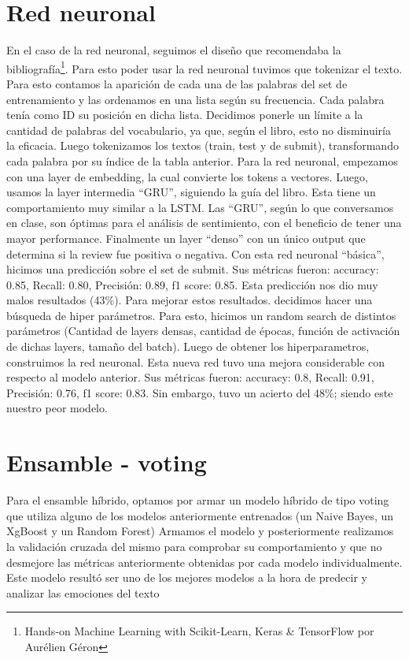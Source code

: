 \documentclass{article}
\begin{document}
\section*{Red neuronal}
En el caso de la red neuronal, seguimos el diseño que recomendaba la bibliografía\footnote{Hands-on Machine Learning with Scikit-Learn, Keras \& TensorFlow por Aurélien Géron}.
Para esto poder usar la red neuronal tuvimos que tokenizar el texto. Para esto contamos la aparición de cada una de las palabras del set de entrenamiento y las ordenamos en una lista según su frecuencia. Cada palabra tenía como ID su posición en dicha lista. Decidimos ponerle un límite a la cantidad de palabras del vocabulario, ya que, según el libro, esto no disminuiría la eficacia.  Luego tokenizamos los textos (train, test y de submit), transformando cada palabra por su índice de la tabla anterior. 
Para la red neuronal, empezamos con una layer de embedding, la cual convierte los tokens a vectores. Luego, usamos la layer intermedia “GRU”, siguiendo la guía del libro. Esta tiene un comportamiento muy similar a la LSTM. Las “GRU”, según lo que conversamos en clase,  son óptimas para el análisis de sentimiento, con el beneficio de tener una mayor performance. Finalmente un layer “denso” con un único output que determina si la review fue positiva o negativa. 
Con esta red neuronal “básica”, hicimos una predicción sobre el set de submit. Sus métricas fueron: accuracy: 0.85,  Recall: 0.80, Precisión: 0.89, f1 score: 0.85. Esta predicción nos dio muy malos resultados (43\%).
Para mejorar estos resultados. decidimos hacer una búsqueda de hiper parámetros.  Para esto, hicimos un random search de distintos parámetros (Cantidad de layers densas, cantidad de épocas, función de activación de dichas layers, tamaño del batch). Luego de obtener los hiperparametros, construimos la red neuronal. Esta nueva red tuvo una mejora considerable con respecto al modelo anterior. Sus métricas fueron: accuracy: 0.8, Recall: 0.91, Precisión: 0.76, f1 score: 0.83. Sin embargo, tuvo un acierto del 48\%; siendo este nuestro peor modelo. 


\section*{Ensamble - voting}


Para el ensamble híbrido, optamos por armar un modelo híbrido de tipo voting que utiliza alguno de los modelos anteriormente entrenados (un Naive Bayes, un XgBoost y un Random Forest) Armamos el modelo y posteriormente realizamos la validación cruzada del mismo para comprobar su comportamiento y que no desmejore las métricas anteriormente obtenidas por cada modelo individualmente. Este modelo resultó ser uno de los mejores modelos a la hora de predecir y analizar las emociones del texto 
\end{document}
